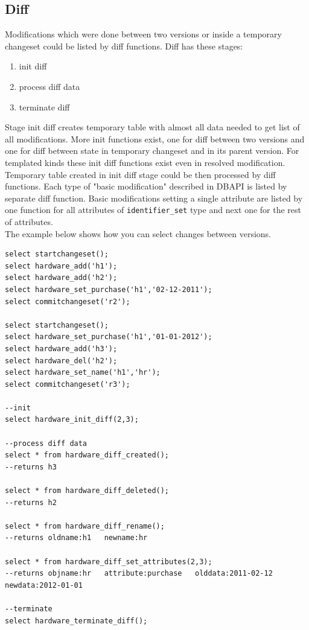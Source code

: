 \documentclass[deska]{subfiles}
\begin{document}
\subsection{Diff}
Modifications which were done between two versions or inside a temporary changeset could be listed by diff functions. Diff has these stages:
\begin{enumerate}
    \item init diff
    \item process diff data
    \item terminate diff
\end{enumerate}
Stage init diff creates temporary table with almost all data needed to get list of all modifications.
More init functions exist, one for diff between two versions and one for diff between state in temporary changeset and in its parent version. For templated kinds these init diff functions exist even in resolved modification.\\
Temporary table created in init diff stage could be then processed by diff functions. Each type of "basic modification" described in DBAPI  is listed by separate diff function. Basic modifications setting a single attribute are listed by one function for all attributes of {\tt identifier\_set} type and next one for the rest of attributes.\\
The example below shows how you can select changes between versions.

\begin{verbatim}
select startchangeset();
select hardware_add('h1');
select hardware_add('h2');
select hardware_set_purchase('h1','02-12-2011');
select commitchangeset('r2');

select startchangeset();
select hardware_set_purchase('h1','01-01-2012');
select hardware_add('h3');
select hardware_del('h2');
select hardware_set_name('h1','hr');
select commitchangeset('r3');

--init
select hardware_init_diff(2,3);

--process diff data
select * from hardware_diff_created();
--returns h3

select * from hardware_diff_deleted();
--returns h2

select * from hardware_diff_rename();
--returns oldname:h1   newname:hr

select * from hardware_diff_set_attributes(2,3);
--returns objname:hr   attribute:purchase   olddata:2011-02-12   newdata:2012-01-01

--terminate
select hardware_terminate_diff();
\end{verbatim}
\end{document}
